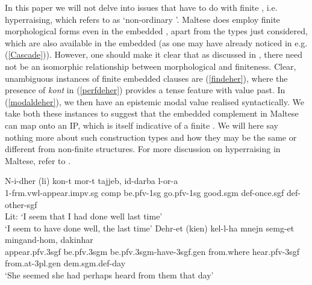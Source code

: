 \documentclass[output=paper]{LSP/langsci}
\begin{document}
In this paper we will not delve into issues that have to do with finite , i.e. hyperraising, which  refers to as `non-ordinary '. 
Maltese does employ finite morphological forms even in the embedded , apart from the  types just considered, which are also available in the embedded  (as one may have already noticed in e.g. (\ref{Cascade})). However, one should make it clear that as discussed in \citet{Sells06}, there need not be an isomorphic relationship between morphological and  finiteness. Clear, unambiguous instances of finite embedded clauses are (\ref{findeher}), where the presence of \emph{kont} in (\ref{perfdeher}) provides a {\sc tense} feature with value {\sc past}. In (\ref{modaldeher}), we then have an epistemic modal value realised syntactically. We take both these instances to suggest that the embedded complement in Maltese can map onto an IP, which is itself indicative of a finite . We will here say nothing more about such construction types and how they may be the same or different from non-finite  structures. For more discussion on hyperraising in Maltese, refer to \citet{CamilleriTA}.

\newpage 
\ea \label{findeher}
\ea \label{perfdeher}
\gll N-i-dher (li) kon-t mor-t tajjeb, id-darba l-o\textcrh r-a\\
1-{\sc frm.vwl}-appear.{\sc impv.sg} {\sc comp} be.{\sc pfv-1sg} go.{\sc pfv-1sg} good.{\sc sgm} {\sc def-}once.{\sc sgf} {\sc def-}other-{\sc sgf}\\
\glt Lit: `I seem that I had done well last time'\\
\glt `I seem to have done well, the last time' 
\ex \label{modaldeher}
\gll Dehr-et (kien) kel-l-ha mnejn semg\textcrh-et ming\textcrh and-hom, dakinhar\\
appear.{\sc pfv.3sgf} be.{\sc pfv.3sgm} be.{\sc pfv.3sgm}-have-{\sc 3sgf.gen} from.where hear.{\sc pfv-3sgf} from.at-{\sc 3pl.gen} {\sc dem.sgm.def-}day\\
\glt `She seemed she had perhaps heard from them that day' 
\z
\z  
\end{document}

